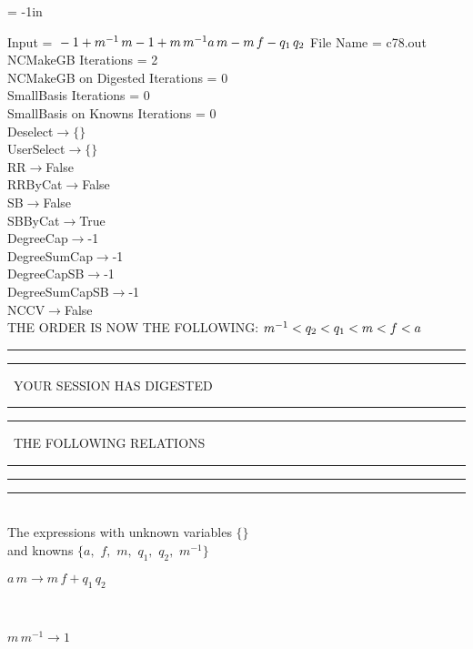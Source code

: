 \voffset = -1in
\evensidemargin 0.1in
\oddsidemargin 0.1in
\textheight 9in
\textwidth 6in

\normalsize
\baselineskip=12pt
\noindent
Input = 
$
\\-1 + m^{ -1 }\,
 m\\
-1 + m\,
 m^{ -1 }\\
a\,
 m - m\,
 f - q_{1}\,
 q_{2}\\
$
File Name = c78.out\\
NCMakeGB Iterations = 2\\
NCMakeGB on Digested Iterations = 0\\
SmallBasis Iterations = 0\\
SmallBasis on Knowns Iterations = 0\\
Deselect$\rightarrow \{\}$\\
UserSelect$\rightarrow \{\}$\\
RR$\rightarrow $False\\
RRByCat$\rightarrow $False\\
SB$\rightarrow $False\\
SBByCat$\rightarrow $True\\
DegreeCap$\rightarrow $-1\\
DegreeSumCap$\rightarrow $-1\\
DegreeCapSB$\rightarrow $-1\\
DegreeSumCapSB$\rightarrow $-1\\
NCCV$\rightarrow $False\\
THE ORDER IS NOW THE FOLLOWING:\hfil\break
$
m^{ -1 }<q_{2}<q_{1}<m<f<a\\
$
\rule[2pt]{6in}{4pt}\hfil\break
\rule[2pt]{1.879in}{4pt}
\ YOUR SESSION HAS DIGESTED\ 
\rule[2pt]{1.879in}{4pt}\hfil\break
\rule[2pt]{1.923in}{4pt}
\ THE FOLLOWING RELATIONS\ 
\rule[2pt]{1.923in}{4pt}\hfil\break
\rule[2pt]{6in}{4pt}\hfil\break
\rule[3pt]{6in}{.7pt}\\
The expressions with unknown variables $\{\}$\\
and knowns $\{a,
$ $
f,
$ $
m,
$ $
q_{1},
$ $
q_{2},
$ $
m^{ -1 }\}$\smallskip\\
\begin{minipage}{6in}
$
a\,
 m\rightarrow m\,
 f + q_{1}\,
 q_{2}
$
\end{minipage}\medskip \\
\begin{minipage}{6in}
$
m\,
 m^{ -1 }\rightarrow 1
$
\end{minipage}\medskip \\
